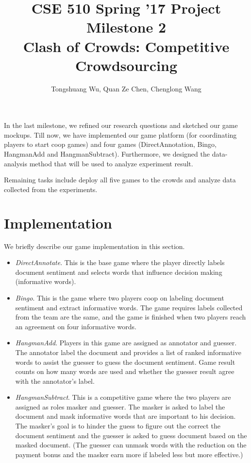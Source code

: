 \documentclass{article}
\title{{\large{CSE 510 Spring '17 Project Milestone 2}}
\\ \textbf{Clash of Crowds: Competitive Crowdsourcing}}
\author{Tongshuang Wu, Quan Ze Chen, Chenglong Wang}
\date{}
\begin{document}
\maketitle


In the last milestone, we refined our research questions and sketched our game mockups. Till now, we have implemented our game platform (for coordinating players to start coop games) and four games (DirectAnnotation, Bingo, HangmanAdd and HangmanSubtract). Furthermore, we designed the data-analysis method that will be used to analyze experiment result.

Remaining tasks include deploy all five games to the crowds and analyze data collected from the experiments.

\section{Implementation}

We briefly describe our game implementation in this section. 

\begin{itemize}
\item \emph{DirectAnnotate}. This is the base game where the player directly labels document sentiment and selects words that influence decision making (informative words).
\item \emph{Bingo}. This is the game where two players coop on labeling document sentiment and extract informative words. The game requires labels collected from the team are the same, and the game is finished when two players reach an agreement on four informative words. 
\item \emph{HangmanAdd}. Players in this game are assigned as annotator and guesser. The annotator label the document and provides a list of ranked informative words to assist the guesser to guess the document sentiment. Game result counts on how many words are used and whether the guesser result agree with the annotator's label.
\item \emph{HangmanSubtract}. This is a competitive game where the two players are assigned as roles masker and guesser. The masker is asked to label the document and mask informative words that are important to his decision. The masker's goal is to hinder the guess to figure out the correct the document sentiment and the guesser is asked to guess document based on the masked document. (The guesser can unmask words with the reduction on the payment bonus and the masker earn more if labeled less but more effective.) 

\end{itemize}
\end{document}
